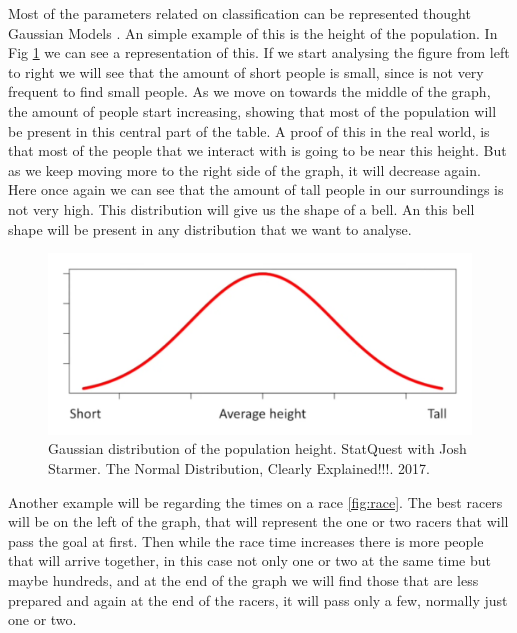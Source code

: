 \documentclass[conference]{IEEEtran}
\begin{document}
Most of the parameters related on classification can be represented thought Gaussian Models \cite{normal_dist}. An simple example of this is the height of the population. In Fig \ref{fig:height} we can see a representation of this. If we start analysing the figure from left to right we will see that the amount of short people is small, since is not very frequent to find small people. As we move on towards the middle of the graph, the amount of people start increasing, showing that most of the population will be present in this central part of the table. A proof of this in the real world, is that most of the people that we interact with is going to be near this height. But as we keep moving more to the right side of the graph, it will decrease again. Here once again we can see that the amount of tall people in our surroundings is not very high. This distribution will give us the shape of a bell. An this bell shape will be present in any distribution that we want to analyse. 

\begin{figure}
	\label{fig:height}
	\includegraphics[scale=0.25]{imgs/height.png}
	\caption{Gaussian distribution of the population height. StatQuest with Josh Starmer. The Normal Distribution, Clearly Explained!!!. 2017.}
\end{figure}

Another example will be regarding the times on a race \ref{fig:race}. The best racers will be on the left of the graph, that will represent the one or two racers that will pass the goal at first. Then while the race time increases there is more people that will arrive together, in this case not only one or two at the same time but maybe hundreds, and at the end of the graph we will find those that are less prepared and again at the end of the racers, it will pass only a few, normally just one or two.
\end{document}

